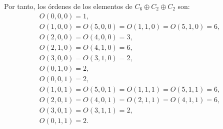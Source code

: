\begin{ejercicio}
\begin{enumerate}
\begin{enumerate}
            Por tanto, los órdenes de los elementos de $C_6 \oplus C_2 \oplus C_2$ son:
            \begin{gather*}
                O(0, 0, 0) = 1, \\
                O(1, 0, 0) = O(5, 0, 0) = O(1, 1, 0) = O(5, 1, 0) = 6, \\
                O(2, 0, 0) = O(4, 0, 0) = 3, \\
                O(2, 1, 0) = O(4, 1, 0) = 6, \\
                O(3, 0, 0) = O(3, 1, 0) = 2, \\
                O(0, 1, 0) = 2, \\
                O(0, 0, 1) = 2, \\
                O(1, 0, 1) = O(5, 0, 1) = O(1, 1, 1) = O(5, 1, 1) = 6, \\
                O(2, 0, 1) = O(4, 0, 1) = O(2, 1, 1) = O(4, 1, 1) = 6, \\
                O(3, 0, 1) = O(3, 1, 1) = 2, \\
                O(0, 1, 1) = 2.
            \end{gather*}
        \end{enumerate}







    \end{enumerate}
\end{ejercicio}

